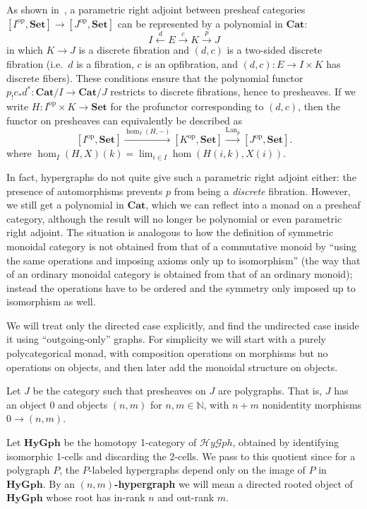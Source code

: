 \documentclass{article}
\theoremstyle{definition}
\theoremstyle{remark}
\def\Set{\mathbf{Set}}
\def\Cat{\ensuremath{\mathbf{Cat}}}
\def\op{^{\mathrm{op}}}
\def\lan{\operatorname{Lan}}
\let\xto\xrightarrow
\let\xot\xleftarrow
\def\N{\mathbb{N}}
\def\hy{\mathcal{H}\mathit{y}\mathcal{G}\mathit{ph}}
\def\hohy{\mathbf{HyGph}}
\begin{document}
As shown in~\cite{weber:fam-pra}, a parametric right adjoint between presheaf categories $[I\op,\Set]\to [J\op,\Set]$ can be represented by a polynomial in \Cat:
\[ I \xot{d} E \xto{c} K \xto{p} J \]
in which $K\to J$ is a discrete fibration and $(d,c)$ is a two-sided discrete fibration (i.e.\ $d$ is a fibration, $c$ is an opfibration, and $(d,c): E \to I\times K$ has discrete fibers).
These conditions ensure that the polynomial functor $p_! c_* d^* : \Cat/I \to \Cat/J$ restricts to discrete fibrations, hence to presheaves.
If we write $H:I\op\times K\to \Set$ for the profunctor corresponding to $(d,c)$, then the functor on presheaves can equivalently be described as
\[ [I\op,\Set] \xto{\hom_I(H,-)} [K\op,\Set] \xto{\lan_p} [J\op,\Set]. \]
where $\hom_I(H,X)(k) = \lim_{i\in I} \hom(H(i,k),X(i))$.

In fact, hypergraphs do not quite give such a parametric right adjoint either: the presence of automorphisms prevents $p$ from being a \emph{discrete} fibration.
However, we still get a polynomial in \Cat, which we can reflect into a monad on a presheaf category, although the result will no longer be polynomial or even parametric right adjoint.
The situation is analogous to how the definition of symmetric monoidal category is not obtained from that of a commutative monoid by ``using the same operations and imposing axioms only up to isomorphism'' (the way that of an ordinary monoidal category is obtained from that of an ordinary monoid); instead the operations have to be ordered and the symmetry only imposed up to isomorphism as well.

We will treat only the directed case explicitly, and find the undirected case inside it using ``outgoing-only'' graphs.
For simplicity we will start with a purely polycategorical monad, with composition operations on morphisms but no operations on objects, and then later add the monoidal structure on objects.

Let $J$ be the category such that presheaves on $J$ are polygraphs.
That is, $J$ has an object $0$ and objects $(n,m)$ for $n,m\in\N$, with $n+m$ nonidentity morphisms $0\to (n,m)$.

Let $\hohy$ be the homotopy 1-category of $\hy$, obtained by identifying isomorphic 1-cells and discarding the 2-cells.
We pass to this quotient since for a polygraph $P$, the $P$-labeled hypergraphs depend only on the image of $P$ in $\hohy$.
By an \textbf{$(n,m)$-hypergraph} we will mean a directed rooted object of $\hohy$ whose root has in-rank $n$ and out-rank $m$.
\end{document}
